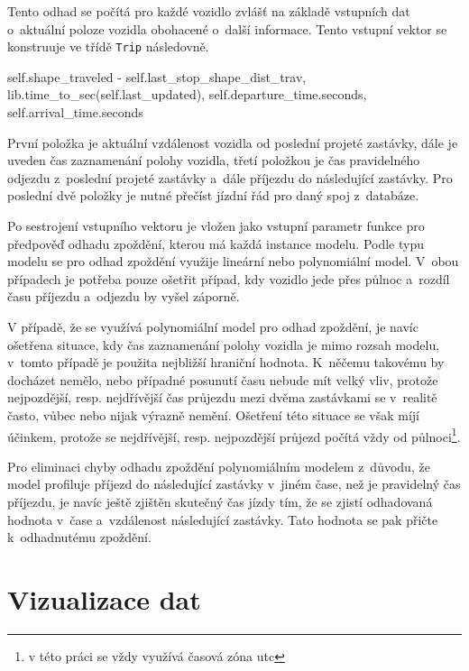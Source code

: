 Tento odhad se počítá pro každé vozidlo zvlášť na základě vstupních dat o~aktuální poloze vozidla obohacené o~další informace. Tento vstupní vektor se konstruuje ve třídě \verb-Trip- následovně.


\begin{code}[frame=none]
self.shape_traveled - self.last_stop_shape_dist_trav,
lib.time_to_sec(self.last_updated),
self.departure_time.seconds,
self.arrival_time.seconds
\end{code}


\bigbreak


První položka je aktuální vzdálenost vozidla od poslední projeté zastávky, dále je uveden čas zaznamenání polohy vozidla, třetí položkou je čas pravidelného odjezdu z~poslední projeté zastávky a~dále příjezdu do následující zastávky. Pro poslední dvě položky je nutné přečíst jízdní řád pro daný spoj z~databáze.


\bigbreak


Po sestrojení vstupního vektoru je vložen jako vstupní parametr funkce pro předpověď odhadu zpoždění, kterou má každá instance modelu. Podle typu modelu se pro odhad zpoždění využije lineární nebo polynomiální model. V~obou případech je potřeba pouze ošetřit případ, kdy vozidlo jede přes půlnoc a~rozdíl času příjezdu a~odjezdu by vyšel záporně.


\bigbreak


V případě, že se využívá polynomiální model pro odhad zpoždění, je navíc ošetřena situace, kdy čas zaznamenání polohy vozidla je mimo rozsah modelu, v~tomto případě je použita nejbližší hraniční hodnota. K~něčemu takovému by docházet nemělo, nebo případné posunutí času nebude mít velký vliv, protože nejpozdější, resp. nejdřívější čas průjezdu mezi dvěma zastávkami se v~realitě často, vůbec nebo nijak výrazně nemění. Ošetření této situace se však míjí účinkem, protože se nejdřívější, resp. nejpozdější průjezd počítá vždy od půlnoci\footnote{v této práci se vždy využívá časová zóna \gls{utc}}.


\bigbreak


Pro eliminaci chyby odhadu zpoždění polynomiálním modelem z~důvodu, že model profiluje příjezd do následující zastávky v~jiném čase, než je pravidelný čas příjezdu, je navíc ještě zjištěn skutečný čas jízdy tím, že se zjistí odhadovaná hodnota v~čase a~vzdálenost následující zastávky. Tato hodnota se pak přičte k~odhadnutému zpoždění.


\section{Vizualizace dat}


